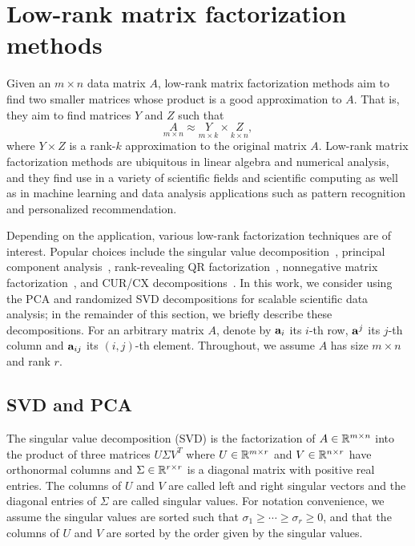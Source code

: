 \section{Low-rank matrix factorization methods}
\label{sxn:low-rank-methods}

Given an $m \times n$ data matrix $A$, low-rank matrix factorization methods
aim to find two smaller matrices whose product is a good approximation to $A$.
That is, they aim to find matrices $Y$ and $Z$ such that
\begin{equation}
 \label{eqn:apprx}
    \underset{m\times n}{A} \approx \underset{m\times k}{Y} \times \underset{k\times n}{Z} , 
\end{equation}
where $Y \times Z$ is a rank-$k$ approximation to the original matrix $A$.
Low-rank matrix factorization methods are ubiquitous in linear algebra
and numerical analysis, and they find use in a variety of scientific fields and
scientific computing as well as in machine learning and data analysis
applications such as pattern recognition and personalized recommendation.

Depending on the application, various low-rank factorization techniques are of
interest.  Popular choices include the singular value
decomposition~\cite{GVL96}, principal component analysis~\cite{pcaBook},
rank-revealing QR factorization~\cite{GE96}, nonnegative matrix
factorization~\cite{NMFalg}, and CUR/CX decompositions~\cite{CUR_PNAS}.  In
this work, we consider using the PCA and randomized SVD decompositions for scalable 
scientific data analysis; in the remainder of this section, we briefly
describe these decompositions.
For an arbitrary matrix $A$, denote by $\mathbf{a}_i$
its $i$-th row, $\mathbf{a}^j$ its $j$-th column and $\mathbf{a}_{ij}$ its $(i,j)$-th element.
Throughout, we assume $A$ has size $m \times n$ and rank $r$.


\subsection{SVD and PCA}

The singular value decomposition (SVD) is the factorization of $A \in
\mathbb{R}^{m\times n}$ into the product of three matrices $U\Sigma V^T$ where $U
\in \mathbb{R}^{m\times r}$ and $V\in \mathbb{R}^{n\times r}$ have orthonormal columns
and $\Sigma\in \mathbb{R}^{r\times r}$ is a diagonal matrix with positive real
entries. The columns of $U$ and $V$ are called left and right singular vectors
and the diagonal entries of $\Sigma$ are called singular values.  For notation
convenience, we assume the singular values are sorted such that $\sigma_1\geq
\cdots \geq \sigma_r\geq 0$, and that the columns of $U$ and $V$ are
sorted by the order given by the singular values.  
 
